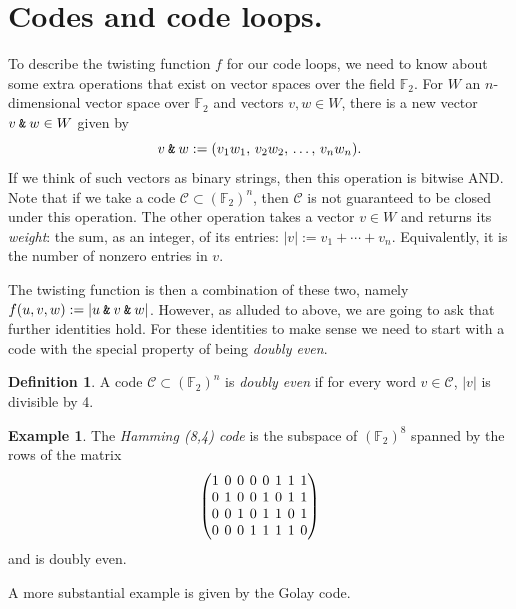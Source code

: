 \documentclass{article}
\theoremstyle{plain}
\theoremstyle{definition}
\newtheorem*{definition}{Definition}
\newtheorem{example}{Example}
\def \cC {\mathcal{C}}
\def \FF {\mathbb{F}}
\newcommand{\AND}{\mathbin{\textup{\texttt{\&}}}}
\begin{document}
\section{Codes and code loops.}

To describe the twisting function $f$ for our code loops, we need to know about some extra operations that exist on vector spaces over the field $\FF_2$. 
For $W$ an $n$-dimensional vector space over $\FF_2$ and vectors $v,w\in W$, there is a new vector $v\AND w \in W$ given by
\[
	v\AND w := (v_1w_1,\,v_2w_2,\,\ldots,\,v_nw_n).
\]
If we think of such vectors as binary strings, then this operation is bitwise AND. 
Note that if we take a code $\cC \subset (\FF_2)^n$, then $\cC$ is not guaranteed to be closed under this operation.
The other operation takes a vector $v\in W$ and returns its \emph{weight}: the sum, as an integer, of its entries: $|v| := v_1 + \cdots + v_n$. 
Equivalently, it is the number of nonzero entries in $v$.

The twisting function is then a combination of these two, namely $f(u,v,w) := |u\AND v\AND w|$.
However, as alluded to above, we are going to ask that further identities hold. 
For these identities to make sense we need to start with a code with the special property of being \emph{doubly even}.

\begin{definition}
A code $\cC \subset (\FF_2)^n$ is \emph{doubly even} if for every word $v\in \cC$, $|v|$ is divisible by 4. 
\end{definition}


\begin{example}\label{example:Hamming}
The \emph{Hamming (8,4) code} is the subspace of $(\FF_2)^8$ spanned by the rows of the matrix
\[
\begingroup %
\setlength\arraycolsep{2pt}
\begin{pmatrix}
1&0&0&0&0&1&1&1\\
0&1&0&0&1&0&1&1\\
0&0&1&0&1&1&0&1\\
0&0&0&1&1&1&1&0
\end{pmatrix}
\endgroup
\]
and is doubly even.
\end{example}

A more substantial example is given by the Golay code.
\end{document}
